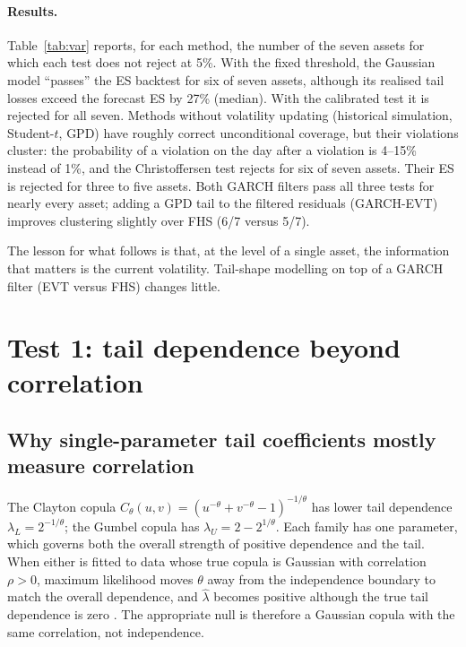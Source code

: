 \documentclass[11pt]{article}
\newcommand{\1}{\mathbf{1}}
\begin{document}


\paragraph{Results.}
Table~\ref{tab:var} reports, for each method, the number of the seven assets for which each test
does not reject at 5\%. With the fixed threshold, the Gaussian model ``passes'' the ES backtest for six of
seven assets, although its realised tail losses exceed the forecast ES by 27\% (median). With the
calibrated test it is rejected for all seven. Methods without volatility updating (historical simulation,
Student-$t$, GPD) have roughly correct unconditional coverage, but their violations cluster: the
probability of a violation on the day after a violation is 4--15\% instead of 1\%, and the
Christoffersen test rejects for six of seven assets. Their ES is rejected for three to five assets. Both GARCH
filters pass all three tests for nearly every asset; adding a GPD tail to the filtered residuals (GARCH-EVT)
improves clustering slightly over FHS (6/7 versus 5/7).



The lesson for what follows is that, at the level of a single asset, the information that matters is the
current volatility. Tail-shape modelling on top of a GARCH filter (EVT versus FHS) changes little.

\section{Test 1: tail dependence beyond correlation}
\label{sec:test1}

\subsection{Why single-parameter tail coefficients mostly measure correlation}

The Clayton copula $C_\theta(u,v) = (u^{-\theta}+v^{-\theta}-1)^{-1/\theta}$ has lower tail dependence
$\lambda_L = 2^{-1/\theta}$; the Gumbel copula has $\lambda_U = 2-2^{1/\theta}$. Each family has one
parameter, which governs both the overall strength of positive dependence and the tail. When either is fitted
to data whose true copula is Gaussian with correlation $\rho>0$, maximum likelihood moves $\theta$ away from
the independence boundary to match the overall dependence, and $\hat\lambda$ becomes positive although the
true tail dependence is zero \citep{joe1997}. The appropriate null is therefore a Gaussian copula with the
same correlation, not independence.
\end{document}
